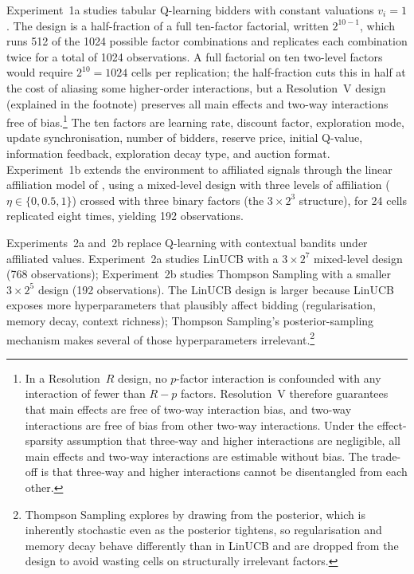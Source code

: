 Experiment~1a studies tabular Q-learning bidders with constant valuations $v_i = 1$. The design is a half-fraction of a full ten-factor factorial, written $2^{10-1}$, which runs 512 of the 1024 possible factor combinations and replicates each combination twice for a total of 1024 observations. A full factorial on ten two-level factors would require $2^{10} = 1024$ cells per replication; the half-fraction cuts this in half at the cost of aliasing some higher-order interactions, but a Resolution~V design (explained in the footnote) preserves all main effects and two-way interactions free of bias.\footnote{In a Resolution~$R$ design, no $p$-factor interaction is confounded with any interaction of fewer than $R - p$ factors. Resolution~V therefore guarantees that main effects are free of two-way interaction bias, and two-way interactions are free of bias from other two-way interactions. Under the effect-sparsity assumption that three-way and higher interactions are negligible, all main effects and two-way interactions are estimable without bias. The trade-off is that three-way and higher interactions cannot be disentangled from each other.} The ten factors are learning rate, discount factor, exploration mode, update synchronisation, number of bidders, reserve price, initial Q-value, information feedback, exploration decay type, and auction format. Experiment~1b extends the environment to affiliated signals through the linear affiliation model of , using a mixed-level design with three levels of affiliation ($\eta \in \{0, 0.5, 1\}$) crossed with three binary factors (the $3 \times 2^3$ structure), for 24 cells replicated eight times, yielding 192 observations.

Experiments~2a and~2b replace Q-learning with contextual bandits under affiliated values. Experiment~2a studies LinUCB with a $3 \times 2^7$ mixed-level design (768 observations); Experiment~2b studies Thompson Sampling with a smaller $3 \times 2^5$ design (192 observations). The LinUCB design is larger because LinUCB exposes more hyperparameters that plausibly affect bidding (regularisation, memory decay, context richness); Thompson Sampling's posterior-sampling mechanism makes several of those hyperparameters irrelevant.\footnote{Thompson Sampling explores by drawing from the posterior, which is inherently stochastic even as the posterior tightens, so regularisation and memory decay behave differently than in LinUCB and are dropped from the design to avoid wasting cells on structurally irrelevant factors.}

